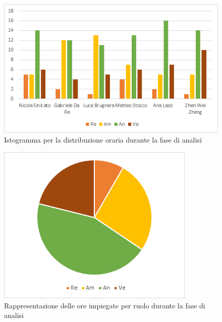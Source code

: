 \begin{figure}[H]
    \centering
    \includegraphics[scale=0.6]{img/grafi preventivo/istogrammi/analisi/totale.png}
    \caption{Istogramma per la distribuzione oraria durante la fase di analisi}
\end{figure}
\begin{figure}[H]
    \centering
    \includegraphics[scale=0.6]{img/grafi preventivo/torta/analisi/totale.png}
    \caption{Rappresentazione delle ore impiegate per ruolo durante la fase di analisi}
\end{figure}

